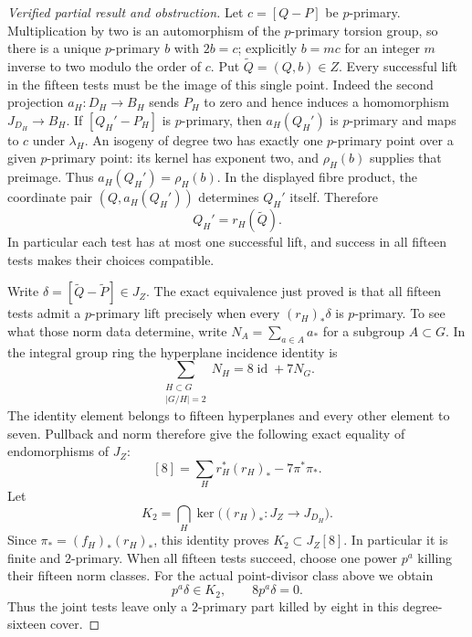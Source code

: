 \begin{proof}[Verified partial result and obstruction]
Let $c=[Q-P]$ be $p$-primary. Multiplication by two is an
automorphism of the $p$-primary torsion group, so there is a unique
$p$-primary $b$ with $2b=c$; explicitly $b=mc$ for an integer
$m$ inverse to two modulo the order of $c$. Put
$\widetilde Q=(Q,b)\in Z$. Every successful lift in the fifteen
tests must be the image of this single point. Indeed the second
projection $a_H:D_H\to B_H$ sends $P_H$ to zero and hence induces
a homomorphism $J_{D_H}\to B_H$. If
$[Q_H'-P_H]$ is $p$-primary, then $a_H(Q_H')$ is $p$-primary
and maps to $c$ under $\lambda_H$. An isogeny of degree two
has exactly one $p$-primary point over a given $p$-primary point:
its kernel has exponent two, and $\rho_H(b)$ supplies that
preimage. Thus $a_H(Q_H')=\rho_H(b)$. In the displayed fibre
product, the coordinate pair $(Q,a_H(Q_H'))$ determines $Q_H'$
itself. Therefore
\[
       Q_H'=r_H(\widetilde Q).
\]
In particular each test has at most one successful lift, and
success in all fifteen tests makes their choices compatible.

Write $\delta=[\widetilde Q-\widetilde P]\in J_Z$.
The exact equivalence just proved is that all fifteen tests
admit a $p$-primary lift precisely when every
$(r_H)_*\delta$ is $p$-primary. To see what those norm data
determine, write $N_A=\sum_{a\in A}a_*$ for a subgroup
$A\subset G$. In the integral group ring the hyperplane
incidence identity is
\[
 \sum_{\substack{H\subset G\\ \lvert G/H\rvert=2}}N_H
       =8\operatorname{id}+7N_G.
\]
The identity element belongs to fifteen hyperplanes and every
other element to seven. Pullback and norm therefore give the
following exact equality of endomorphisms of $J_Z$:
\[
 [8]=\sum_H r_H^*(r_H)_*-7\pi^*\pi_*.
\]
Let
\[
        K_2=\bigcap_H\ker\bigl((r_H)_*:J_Z\to J_{D_H}\bigr).
\]
Since $\pi_*= (f_H)_*(r_H)_*$, this identity proves
$K_2\subset J_Z[8]$. In particular it is finite and
$2$-primary. When all fifteen tests succeed, choose one power
$p^a$ killing their fifteen norm classes. For the actual
point-divisor class above we obtain
\[
          p^a\delta\in K_2,\qquad 8p^a\delta=0.
\]
Thus the joint tests leave only a $2$-primary part killed by
eight in this degree-sixteen cover.


\end{proof}
